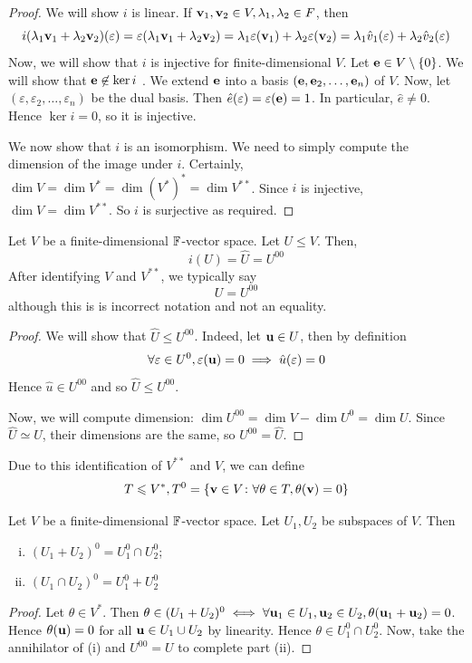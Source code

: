 \documentclass[a4paper,11pt]{article}
\begin{document}
\begin{proof}
	We will show $ i $ is linear.
	If $ {\bf v}_1, {\bf v}_2 \in V, \lambda_1, \lambda_2 \in F $, then
	\[
		i(\lambda_1 {\bf v}_1 + \lambda_2 {\bf v}_2) (\varepsilon) = \varepsilon(\lambda_1 {\bf v}_1 + \lambda_2 {\bf v}_2) = \lambda_1 \varepsilon({\bf v}_1) + \lambda_2 \varepsilon({\bf v}_2) = \lambda_1 \hat v_1(\varepsilon) + \lambda_2 \hat v_2(\varepsilon)
	\]
	Now, we will show that $ i $ is injective for finite-dimensional $ V $.
	Let $ {\bf e} \in V \setminus \qty{0} $.
	We will show that $ {\bf e} \not\in \ker i $
    .
	We extend $ {\bf e} $ into a basis $ ({\bf e}, {\bf e}_2, \dots, {\bf e}_n) $ of $ V $.
	Now, let $ (\varepsilon, \varepsilon_2, \dots, \varepsilon_n) $ be the dual basis.
	Then $ \hat e(\varepsilon) = \varepsilon({\bf e}) = 1 $.
	In particular, $ \hat e \neq 0 $.
	Hence $ \ker i = \qty{0} $, so it is injective.

	We now show that $ i $ is an isomorphism.
	We need to simply compute the dimension of the image under $ i $.
	Certainly, $ \dim V = \dim V^* = \dim (V^*)^* = \dim V^{* *} $.
	Since $ i $ is injective, $ \dim V = \dim V^{* *} $.
	So $ i $ is surjective as required.
\end{proof}
\begin{lemma}
	Let $ V $ be a finite-dimensional $ {\mathbb{F}} $-vector space.
	Let $ U \leq V $.
	Then,
	\[
		i(U)=\hat U = U^{00}
	\]
	After identifying $ V $ and $ V^{* *} $, we typically say
	\[
		U = U^{00}
	\]
	although this is is incorrect notation and not an equality.
\end{lemma}
\begin{proof}
	We will show that $ \hat U \leq U^{00} $.
	Indeed, let $ {\bf u} \in U $, then by definition
	\[
		\forall \varepsilon \in U^0, \varepsilon({\bf u}) = 0 \implies \hat u(\varepsilon) = 0
	\]
	Hence $ \hat u \in U^{00} $ and so $ \hat U \leq U^{00} $.

	Now, we will compute dimension:	$ \dim U^{00} = \dim V - \dim U^0 = \dim U $.
	Since $ \hat U \simeq U $, their dimensions are the same, so $ U^{00} = \hat U $.
\end{proof}
\begin{remark}
	Due to this identification of $ V^{* *} $ and $ V $, we can define
	\[
		T \leqslant V^*, T^0 = \qty{{\bf v}\in V \colon \forall \theta \in T, \theta({\bf v}) = 0}
	\]
\end{remark}
\begin{lemma}
	Let $ V $ be a finite-dimensional $ {\mathbb{F}} $-vector space.
	Let $ U_1, U_2 $ be subspaces of $ V $.
	Then
	\begin{enumerate}[(i)]
		\item $ (U_1 + U_2)^0 = U_1^0 \cap U_2^0 $;
		\item $ (U_1 \cap U_2)^0 = U_1^0 + U_2^0 $
	\end{enumerate}
\end{lemma}
\begin{proof}
	Let $ \theta \in V^* $.
	Then $ \theta \in (U_1 + U_2)^0 \iff \forall {\bf u}_1 \in U_1, {\bf u}_2 \in U_2, \theta({\bf u}_1 + {\bf u}_2) = 0 $.
	Hence $ \theta({\bf u}) = 0 $ for all $ {\bf u} \in U_1 \cup U_2 $ by linearity.
	Hence $ \theta \in U_1^0 \cap U_2^0 $.
	Now, take the annihilator of (i) and $ U^{00} = U $ to complete part (ii).
\end{proof}
\end{document}
